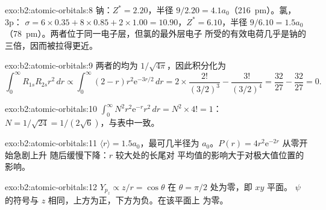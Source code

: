 \begin{solution}{exo:b2:atomic-orbitals:8}
钠：$Z^* = 2.20$，半径 $9/2.20 = 4.1a_0$（\qty{216}{pm}）。氯，3p：
$\sigma = 6 \times 0.35 + 8 \times 0.85 + 2 \times 1.00 = 10.90$，$Z^* = 6.10$，半径
$9/6.10 = 1.5a_0$（\qty{78}{pm}）。两者位于同一电子层，但氯的最外层电子
所受的有效电荷几乎是钠的三倍，因而被拉得更近。
\end{solution}

\begin{solution}{exo:b2:atomic-orbitals:9}
两者的均为 $1/\sqrt{4\pi}$，因此积分化为
\[
  \int_0^\infty R_{1s}R_{2s}r^2\,dr \propto \int_0^\infty (2 - r)r^2\mathrm e^{-3r/2}\,dr =
  2 \times \frac{2!}{(3/2)^3} - \frac{3!}{(3/2)^4} = \frac{32}{27} - \frac{32}{27} = 0 .
\]
\end{solution}

\begin{solution}{exo:b2:atomic-orbitals:10}
$\int_0^\infty N^2r^2\mathrm e^{-r}r^2\,dr = N^2 \times 4! = 1$：$N = 1/\sqrt{24} =
1/(2\sqrt6)$，与表中一致。
\end{solution}

\begin{solution}{exo:b2:atomic-orbitals:11}
$\langle r\rangle = 1.5a_0$，最可几半径为 $a_0$。$P(r) = 4r^2\mathrm e^{-2r}$ 从零开始急剧上升
随后缓慢下降：$r$ 较大处的长尾对
平均值的影响大于对极大值位置的影响。
\end{solution}

\begin{solution}{exo:b2:atomic-orbitals:12}
$Y_{p_z} \propto z/r = \cos\theta$ 在 $\theta = \pi/2$ 处为零，即 $xy$ 平面。
$\psi$ 的符号与 $z$ 相同，上方为正，下方为负。在该平面上
为零。
\end{solution}

